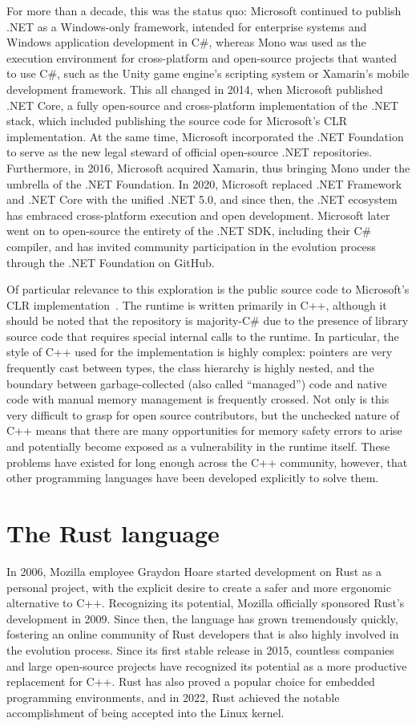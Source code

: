 For more than a decade, this was the status quo: Microsoft continued to publish .NET as a Windows-only framework, intended for enterprise systems and Windows
application development in C\#, whereas Mono was used as the execution environment for cross-platform and open-source projects that wanted to use C\#,
such as the Unity game engine's scripting system or Xamarin's mobile development framework. %
This all changed in 2014, when Microsoft published .NET Core, a fully open-source and cross-platform implementation of the .NET stack,
which included publishing the source code for Microsoft's CLR implementation.
At the same time, Microsoft incorporated the .NET Foundation to serve as the new legal steward of official open-source .NET repositories.
Furthermore, in 2016, Microsoft acquired Xamarin, thus bringing Mono under the umbrella of the .NET Foundation.
In 2020, Microsoft replaced .NET Framework and .NET Core with the unified .NET 5.0, and since then, the .NET ecosystem has embraced
cross-platform execution and open development.
Microsoft later went on to open-source the entirety of the .NET SDK, including their C\# compiler,
and has invited community participation in the evolution process through the .NET Foundation on GitHub.

Of particular relevance to this exploration is the public source code to Microsoft's CLR implementation~\cite{runtime}.
The runtime is written primarily in C++, although it should be noted that the repository is majority-C\# due to the presence of
library source code that requires special internal calls to the runtime.
In particular, the style of C++ used for the implementation is highly complex: pointers are very frequently cast between types,
the class hierarchy is highly nested, and the boundary between garbage-collected (also called ``managed'') code and native code with
manual memory management is frequently crossed.
Not only is this very difficult to grasp for open source contributors, but the unchecked nature of C++ means that there are many
opportunities for memory safety errors to arise and potentially become exposed as a vulnerability in the runtime itself.
These problems have existed for long enough across the C++ community, however, that other programming languages have been developed
explicitly to solve them.

\section{The Rust language}
In 2006, Mozilla employee Graydon Hoare started development on Rust as a personal project,
with the explicit desire to create a safer and more ergonomic alternative to C++.
Recognizing its potential, Mozilla officially sponsored Rust's development in 2009.
Since then, the language has grown tremendously quickly,
fostering an online community of Rust developers that is also highly involved in the evolution process.
Since its first stable release in 2015, countless companies and large open-source projects have recognized its potential
as a more productive replacement for C++.
Rust has also proved a popular choice for embedded programming environments, and in 2022,
Rust achieved the notable accomplishment of being accepted into the Linux kernel.

